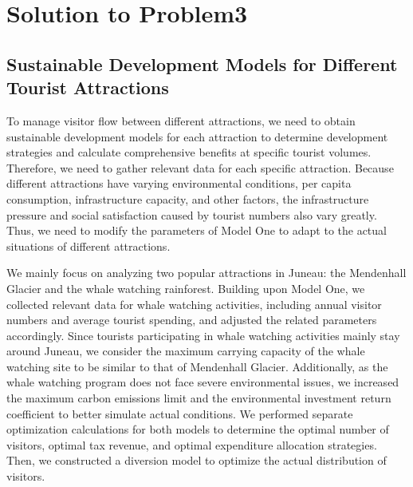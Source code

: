 \documentclass[12pt]{article}  %
\begin{document}
\section{Solution to Problem3}
\subsection{Sustainable Development Models for Different Tourist Attractions}
To manage visitor flow between different attractions, we need to obtain sustainable development models for each attraction to determine development strategies and calculate comprehensive benefits at specific tourist volumes. Therefore, we need to gather relevant data for each specific attraction. Because different attractions have varying environmental conditions, per capita consumption, infrastructure capacity, and other factors, the infrastructure pressure and social satisfaction caused by tourist numbers also vary greatly. Thus, we need to modify the parameters of Model One to adapt to the actual situations of different attractions.

We mainly focus on analyzing two popular attractions in Juneau: the Mendenhall Glacier and the whale watching rainforest. Building upon Model One, we collected relevant data for whale watching activities, including annual visitor numbers and average tourist spending, and adjusted the related parameters accordingly. Since tourists participating in whale watching activities mainly stay around Juneau, we consider the maximum carrying capacity of the whale watching site to be similar to that of Mendenhall Glacier. Additionally, as the whale watching program does not face severe environmental issues, we increased the maximum carbon emissions limit and the environmental investment return coefficient to better simulate actual conditions.
We performed separate optimization calculations for both models to determine the optimal number of visitors, optimal tax revenue, and optimal expenditure allocation strategies. Then, we constructed a diversion model to optimize the actual distribution of visitors.
\end{document}
